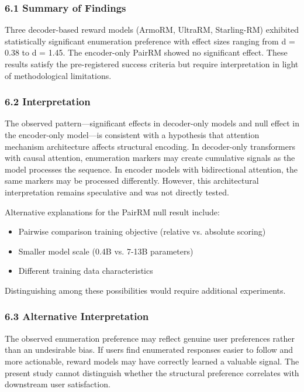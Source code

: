 
\subsubsection{6.1 Summary of Findings}

Three decoder-based reward models (ArmoRM, UltraRM, Starling-RM) exhibited statistically significant enumeration preference with effect sizes ranging from d = 0.38 to d = 1.45. The encoder-only PairRM showed no significant effect. These results satisfy the pre-registered success criteria but require interpretation in light of methodological limitations.

\subsubsection{6.2 Interpretation}

The observed pattern---significant effects in decoder-only models and null effect in the encoder-only model---is consistent with a hypothesis that attention mechanism architecture affects structural encoding. In decoder-only transformers with causal attention, enumeration markers may create cumulative signals as the model processes the sequence. In encoder models with bidirectional attention, the same markers may be processed differently. However, this architectural interpretation remains speculative and was not directly tested.

Alternative explanations for the PairRM null result include:
\begin{itemize}
\item Pairwise comparison training objective (relative vs. absolute scoring)
\item Smaller model scale (0.4B vs. 7-13B parameters)
\item Different training data characteristics
\end{itemize}

Distinguishing among these possibilities would require additional experiments.

\subsubsection{6.3 Alternative Interpretation}

The observed enumeration preference may reflect genuine user preferences rather than an undesirable bias. If users find enumerated responses easier to follow and more actionable, reward models may have correctly learned a valuable signal. The present study cannot distinguish whether the structural preference correlates with downstream user satisfaction.

